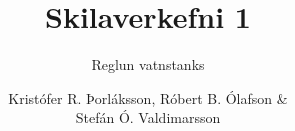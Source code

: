 
\author{Kristófer R. Þorláksson, Róbert B. Ólafson \&\\Stefán Ó. Valdimarsson}  %
\title{Skilaverkefni 1}  %
\subtitle{Reglun vatnstanks}

\usepackage[backend=biber, bibencoding=utf8, style=ieee]{biblatex}

\usepackage[final,hidelinks]{hyperref} %

\usepackage{caption}
\captionsetup[figure]{name = Mynd}

\renewcommand*\listfigurename{Myndayfirlit}